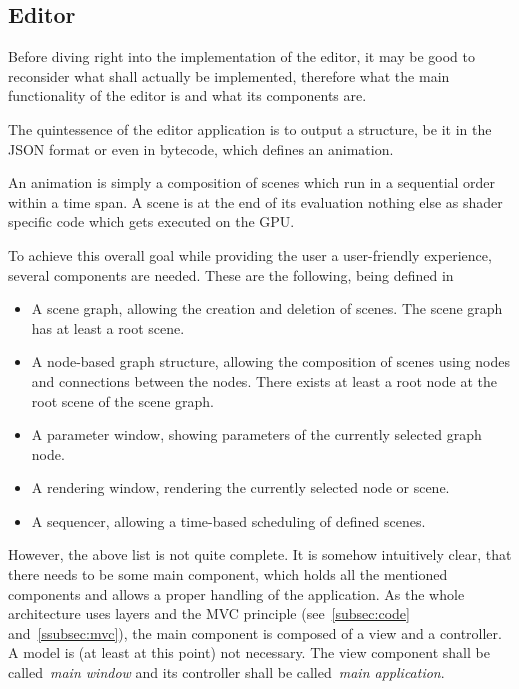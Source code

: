 \documentclass[
    a4paper,      %
    10pt,         %
    openright,    %
    notitlepage,  %
    parskip=half, %
]{scrreprt}       %
\theoremstyle{definition}                    %
\begin{document}
\subsection{Editor}
\label{subsec:editor}

Before diving right into the implementation of the editor, it may be good to
reconsider what shall actually be implemented, therefore what the main
functionality of the editor is and what its components are.

The quintessence of the editor application is to output a structure, be it in
the JSON format or even in bytecode, which defines an animation.

An animation is simply a composition of scenes which run in a sequential order
within a time span. A scene is at the end of its evaluation nothing else as
shader specific code which gets executed on the GPU.

To achieve this overall goal while providing the user a user-friendly
experience, several components are needed. These are the following, being
defined in~

\begin{itemize}
\item A scene graph, allowing the creation and deletion of scenes. The scene graph
      has at least a root scene.
\item A node-based graph structure, allowing the composition of scenes using nodes
      and connections between the nodes. There exists at least a root node at
      the root scene of the scene graph.
\item A parameter window, showing parameters of the currently selected graph node.
\item A rendering window, rendering the currently selected node or scene.
\item A sequencer, allowing a time-based scheduling of defined scenes.
\end{itemize}

However, the above list is not quite complete. It is somehow intuitively clear,
that there needs to be some main component, which holds all the mentioned
components and allows a proper handling of the application. As the whole
architecture uses layers and the MVC principle (see~\autoref{subsec:code}
and~\autoref{ssubsec:mvc}), the main component is composed of a view and a
controller. A model is (at least at this point) not necessary. The view
component shall be called~\textit{main window} and its controller shall be
called~\textit{main application}.
\end{document}
